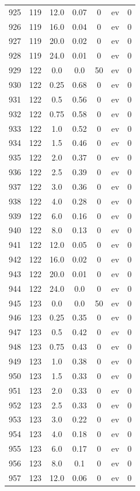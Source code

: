 \documentclass[12pt,a4paper]{article}
\begin{document}
\begin{tabular}{r|cccccc}
	925 & 119 & 12.0 & 0.07 & 0 & ev & 0 \\
	926 & 119 & 16.0 & 0.04 & 0 & ev & 0 \\
	927 & 119 & 20.0 & 0.02 & 0 & ev & 0 \\
	928 & 119 & 24.0 & 0.01 & 0 & ev & 0 \\
	929 & 122 & 0.0 & 0.0 & 50 & ev & 0 \\
	930 & 122 & 0.25 & 0.68 & 0 & ev & 0 \\
	931 & 122 & 0.5 & 0.56 & 0 & ev & 0 \\
	932 & 122 & 0.75 & 0.58 & 0 & ev & 0 \\
	933 & 122 & 1.0 & 0.52 & 0 & ev & 0 \\
	934 & 122 & 1.5 & 0.46 & 0 & ev & 0 \\
	935 & 122 & 2.0 & 0.37 & 0 & ev & 0 \\
	936 & 122 & 2.5 & 0.39 & 0 & ev & 0 \\
	937 & 122 & 3.0 & 0.36 & 0 & ev & 0 \\
	938 & 122 & 4.0 & 0.28 & 0 & ev & 0 \\
	939 & 122 & 6.0 & 0.16 & 0 & ev & 0 \\
	940 & 122 & 8.0 & 0.13 & 0 & ev & 0 \\
	941 & 122 & 12.0 & 0.05 & 0 & ev & 0 \\
	942 & 122 & 16.0 & 0.02 & 0 & ev & 0 \\
	943 & 122 & 20.0 & 0.01 & 0 & ev & 0 \\
	944 & 122 & 24.0 & 0.0 & 0 & ev & 0 \\
	945 & 123 & 0.0 & 0.0 & 50 & ev & 0 \\
	946 & 123 & 0.25 & 0.35 & 0 & ev & 0 \\
	947 & 123 & 0.5 & 0.42 & 0 & ev & 0 \\
	948 & 123 & 0.75 & 0.43 & 0 & ev & 0 \\
	949 & 123 & 1.0 & 0.38 & 0 & ev & 0 \\
	950 & 123 & 1.5 & 0.33 & 0 & ev & 0 \\
	951 & 123 & 2.0 & 0.33 & 0 & ev & 0 \\
	952 & 123 & 2.5 & 0.33 & 0 & ev & 0 \\
	953 & 123 & 3.0 & 0.22 & 0 & ev & 0 \\
	954 & 123 & 4.0 & 0.18 & 0 & ev & 0 \\
	955 & 123 & 6.0 & 0.17 & 0 & ev & 0 \\
	956 & 123 & 8.0 & 0.1 & 0 & ev & 0 \\
	957 & 123 & 12.0 & 0.06 & 0 & ev & 0 \\

\end{tabular}
\end{document}
